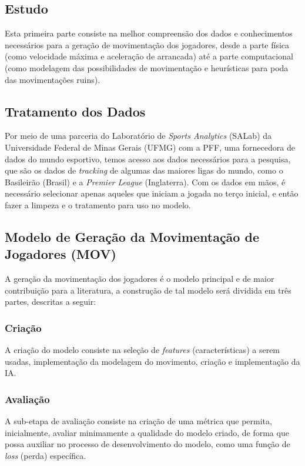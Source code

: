\documentclass[12pt]{article}
\begin{document}
\subsection{Estudo}\label{est}
Esta primeira parte consiste na melhor compreensão dos dados e conhecimentos necessários para a geração de movimentação dos jogadores, desde a parte física (como velocidade máxima e aceleração de arrancada) até a parte computacional (como modelagem das possibilidades de movimentação e heurísticas para poda das movimentações ruins). 

\subsection{Tratamento dos Dados}\label{dad}
Por meio de uma parceria do Laboratório de \textit{Sports Analytics} (SALab) da Universidade Federal de Minas Gerais (UFMG) com a PFF, uma fornecedora de dados do mundo esportivo, temos acesso aos dados necessários para a pesquisa, que são os dados de \textit{tracking} de algumas das maiores ligas do mundo, como o Basileirão (Brasil) e a \textit{Premier League} (Inglaterra). Com os dados em mãos, é necessário selecionar apenas aqueles que iniciam a jogada no terço inicial, e então fazer a limpeza e o tratamento para uso no modelo. 

\subsection{Modelo de Geração da Movimentação de Jogadores (MOV)}\label{mov}
A geração da movimentação dos jogadores é o modelo principal e de maior contribuição para a literatura, a construção de tal modelo será dividida em três partes, descritas a seguir: 

\subsubsection{Criação}\label{mov:cri}
A criação do modelo consiste na seleção de \textit{features} (características) a serem usadas, implementação da modelagem do movimento, criação e implementação da IA.

\subsubsection{Avaliação}\label{mov:aval}
A sub-etapa de avaliação consiste na criação de uma métrica que permita, inicialmente, avaliar minimamente a qualidade do modelo criado, de forma que possa auxiliar no processo de desenvolvimento do modelo, como uma função de \textit{loss} (perda) específica. 
\end{document}
